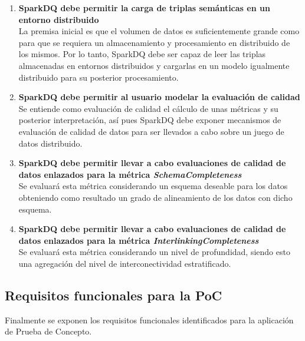 \begin{enumerate}
\item \textbf{SparkDQ debe permitir la carga de triplas semánticas en un entorno
  distribuido} \\La premisa inicial es que el volumen de datos es
  suficientemente grande como para que se requiera un almacenamiento y
  procesamiento en distribuido de los mismos. Por lo tanto, SparkDQ debe ser
  capaz de leer las triplas almacenadas en entornos distribuidos y cargarlas en
  un modelo igualmente distribuido para su posterior procesamiento.
  
\item \textbf{SparkDQ debe permitir al usuario modelar la evaluación de
  calidad}\\Se entiende como evaluación de calidad el cálculo de unas métricas y
  su posterior interpretación, así pues SparkDQ debe exponer mecanismos de
  evaluación de calidad de datos para ser llevados a cabo sobre un juego de
  datos distribuido. 
\item \textbf{SparkDQ debe permitir llevar a cabo evaluaciones de calidad de
  datos enlazados para la métrica \textit{SchemaCompleteness}}\\Se evaluará esta
  métrica considerando un esquema deseable para los datos obteniendo como
  resultado un grado de alineamiento de los datos con dicho esquema. 

\item \textbf{SparkDQ debe permitir llevar a cabo evaluaciones de calidad de
  datos enlazados para la métrica \textit{InterlinkingCompleteness}}\\Se
  evaluará esta métrica considerando un nivel de profundidad, siendo esto una
  agregación del nivel de interconectividad estratificado. 
\end{enumerate}

\subsection{Requisitos funcionales para la \acf{PoC}}

Finalmente se exponen los requisitos funcionales identificados para la
aplicación de Prueba de Concepto.

